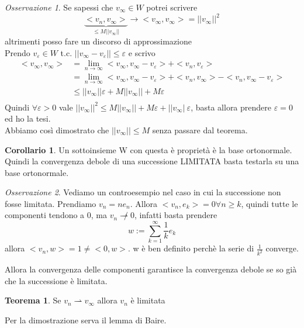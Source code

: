 \documentclass[a4paper]{book}
\theoremstyle{definition}
\theoremstyle{remark}
\newtheorem{oss}{Osservazione}
\theoremstyle{definition}
\newtheorem{teo}{Teorema}
\newtheorem{coroll}{Corollario}
\begin{document}
\begin{oss}
	Se sapessi che $v_\infty \in W$ potrei scrivere $$\underbrace{<v_n, v_\infty>}_{\le M||v_\infty||} \to <v_\infty, v_\infty> = ||v_\infty||^2 $$
	altrimenti posso fare un discorso di approssimazione
	\\
	Prendo $v_\varepsilon \in W$ t.c. $||v_\infty - v_\varepsilon|| \le \varepsilon$ e scrivo 
	\[
	\begin{aligned}	
		<v_\infty, v_\infty> &=\lim_{n\to \infty} <v_\infty, v_\infty - v_\varepsilon> + <v_n, v_\varepsilon>\\
		& = \lim_{n\to \infty} <v_\infty, v_\infty - v_\varepsilon> + <v_n, v_\infty> - <v_n, v_\infty - v_\varepsilon> \\ 
		& \le ||v_\infty||\varepsilon + M ||v_\infty|| + M\varepsilon \\
	\end{aligned}
	\]
	Quindi $\forall \varepsilon >0$ vale $||v_\infty||^2 \le M||v_\infty|| + M\varepsilon + ||v_\infty|\ \varepsilon$, basta allora prendere $\varepsilon = 0 $ ed ho la tesi.
	\\
	Abbiamo così dimostrato che $||v_\infty|| \le M$ senza passare dal teorema.
	
\end{oss}

\begin{coroll}
	Un sottoinsieme W con questa è proprietà è la base ortonormale. Quindi la convergenza debole di una successione LIMITATA basta testarla su una base ortonormale.
\end{coroll}

\begin{oss}
	Vediamo un controesempio nel caso in cui la successione non fosse limitata. Prendiamo $v_n = n e_n$. Allora $<v_n, e_k> = 0 \forall n \ge k$, quindi tutte le componenti tendono a 0, ma $v_n \not\rightharpoonup 0$, infatti basta prendere $$w := \sum_{k=1}^{\infty} \frac{1}{k} e_k$$ allora $<v_n, w> = 1 \not= <0, w>$. w è ben definito perchè la serie di $\frac{1}{k^2}$ converge.
\end{oss}

Allora la convergenza delle componenti garantisce la convergenza debole se so già che la successione è limitata.

\begin{teo}
	Se $v_n \rightharpoonup v_\infty$ allora $v_n$ è limitata
\end{teo}

Per la dimostrazione serva il lemma di Baire.
\end{document}
